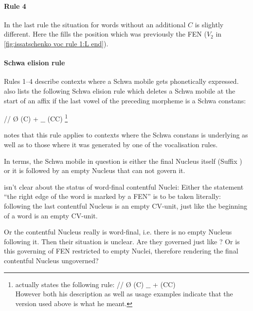 \paragraph{Rule 4}
In the last rule the situation for words without an
additional $C$ is slightly different.
Here the \ti{/\textsce/} fills the position which
was previously the \gls{FEN} ($V_2$ in \cref{fig:issatschenko voc rule 1:L end}).

\paragraph{Schwa elision rule}
Rules 1--4 describe contexts where a Schwa mobile
gets phonetically expressed. \citeauthor{issatschenko1974}
also lists the following Schwa elision rule which deletes
a Schwa mobile at the start of an affix if the last
vowel of the preceding morpheme is a Schwa constans:

\deriv
  {/\schwaMobi/}    %
  {\O}              %
  {\schwaCons {} (C) + $\_\_$ (CC)}%
\footnote{\Textcite{issatschenko1974} actually states the
  following rule:
  \deriv
    {/\schwaMobi/}    %
    {\O}              %
    {\schwaCons {} (C) $\_\_$ + \schwaMobi (CC)}\\
  However both his description as well as usage examples
  indicate that the version used above is what he meant.
}

 notes that this rule
applies to contexts where the Schwa constans is underlying
as well as to those where it was generated by one of the
vocalisation rules.

In \CVCV terms, the Schwa mobile in question is either
the final Nucleus itself (Suffix ) or it is followed
by an empty Nucleus that can not govern it.

\Textcite{scheer2004} isn't clear about the status of
word-final contentful Nuclei:
Either the statement \enquote{the right edge of the word is
  marked by a \acrlong{FEN}} is to be taken
  literally: following the last contentful Nucleus is
  an empty CV-unit, just like the beginning of a word is
  an empty CV-unit.

Or the contentful Nucleus really is word-final,
i.e. there is no empty Nucleus following it.
Then their situation is unclear.
Are they governed just like ?
Or is this governing of \gls{FEN} restricted to empty
Nuclei, therefore rendering the final contentful Nucleus
ungoverned?

